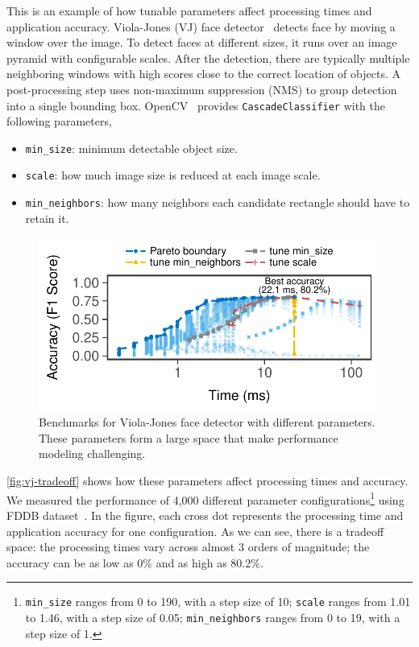  This is an example of how tunable parameters
affect processing times and application accuracy. Viola-Jones (VJ) face
detector~\cite{viola2001rapid} detects face by moving a window over the image.
To detect faces at different sizes, it runs over an image pyramid with
configurable scales. After the detection, there are typically multiple
neighboring windows with high scores close to the correct location of objects.
A post-processing step uses non-maximum suppression (NMS) to group detection
into a single bounding box. OpenCV~\cite{opencvlibrary} provides
\texttt{CascadeClassifier} with the following parameters,

\begin{itemize}[noitemsep, topsep=0pt]
\item \texttt{min\_size}: minimum detectable object size.
\item \texttt{scale}: how much image size is reduced at each image scale.
\item \texttt{min\_neighbors}: how many neighbors each candidate rectangle should
  have to retain it.
\end{itemize}

\begin{figure}[t]
  \centering
  \includegraphics[width=.8\columnwidth]{figures/exhaustive-face.pdf}
  \caption{Benchmarks for Viola-Jones face detector with different
    parameters. These parameters form a large space that make performance
    modeling challenging.}
  \label{fig:vj-tradeoff}
\end{figure}

\autoref{fig:vj-tradeoff} shows how these parameters affect processing times and
accuracy. We measured the performance of 4,000 different parameter
configurations\footnote{\texttt{min\_size} ranges from 0 to 190, with a step
  size of 10; \texttt{scale} ranges from 1.01 to 1.46, with a step size of 0.05;
  \texttt{min\_neighbors} ranges from 0 to 19, with a step size of 1.} using
FDDB dataset~\cite{jain2010fddb}. In the figure, each cross dot represents the
processing time and application accuracy for one configuration. As we can see,
there is a tradeoff space: the processing times vary across almost 3 orders of
magnitude; the accuracy can be as low as 0\% and as high as 80.2\%.

